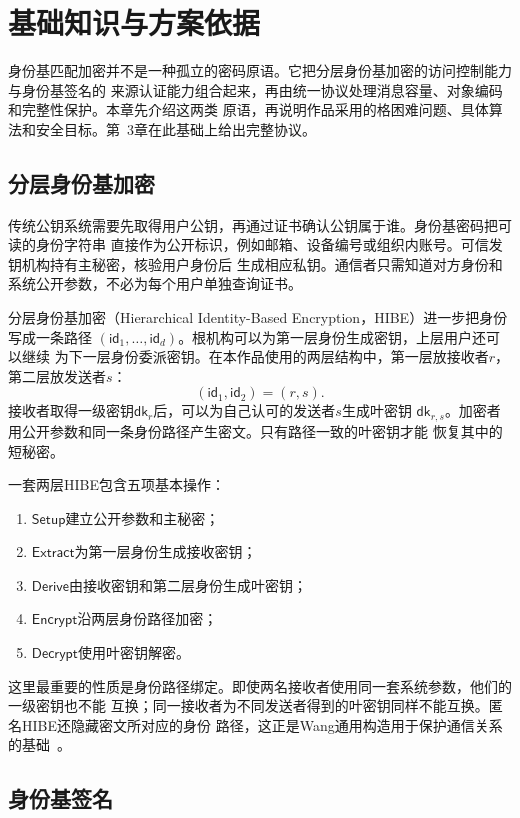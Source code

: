 \chapter{基础知识与方案依据}

身份基匹配加密并不是一种孤立的密码原语。它把分层身份基加密的访问控制能力与身份基签名的
来源认证能力组合起来，再由统一协议处理消息容量、对象编码和完整性保护。本章先介绍这两类
原语，再说明作品采用的格困难问题、具体算法和安全目标。第~3章在此基础上给出完整协议。

\section{分层身份基加密}

传统公钥系统需要先取得用户公钥，再通过证书确认公钥属于谁。身份基密码把可读的身份字符串
直接作为公开标识，例如邮箱、设备编号或组织内账号。可信发钥机构持有主秘密，核验用户身份后
生成相应私钥。通信者只需知道对方身份和系统公开参数，不必为每个用户单独查询证书。

分层身份基加密（Hierarchical Identity-Based Encryption，HIBE）进一步把身份写成一条路径
$(\mathsf{id}_1,\ldots,\mathsf{id}_d)$。根机构可以为第一层身份生成密钥，上层用户还可以继续
为下一层身份委派密钥。在本作品使用的两层结构中，第一层放接收者$r$，第二层放发送者$s$：
\[
  (\mathsf{id}_1,\mathsf{id}_2)=(r,s).
\]
接收者取得一级密钥$\mathsf{dk}_r$后，可以为自己认可的发送者$s$生成叶密钥
$\mathsf{dk}_{r,s}$。加密者用公开参数和同一条身份路径产生密文。只有路径一致的叶密钥才能
恢复其中的短秘密。

一套两层HIBE包含五项基本操作：
\begin{enumerate}
  \item $\mathsf{Setup}$建立公开参数和主秘密；
  \item $\mathsf{Extract}$为第一层身份生成接收密钥；
  \item $\mathsf{Derive}$由接收密钥和第二层身份生成叶密钥；
  \item $\mathsf{Encrypt}$沿两层身份路径加密；
  \item $\mathsf{Decrypt}$使用叶密钥解密。
\end{enumerate}
这里最重要的性质是身份路径绑定。即使两名接收者使用同一套系统参数，他们的一级密钥也不能
互换；同一接收者为不同发送者得到的叶密钥同样不能互换。匿名HIBE还隐藏密文所对应的身份
路径，这正是Wang通用构造用于保护通信关系的基础~\cite{wang2024ibme}。

\section{身份基签名}

